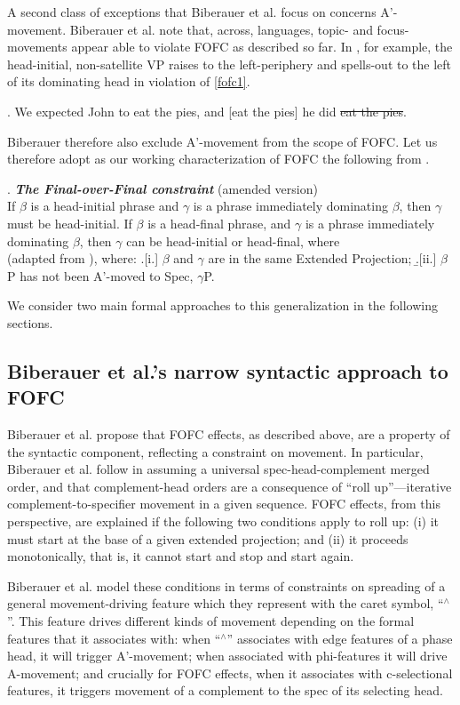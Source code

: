 \documentclass[output=paper]{langscibook}
\begin{document}
	A second class of exceptions that Biberauer et al. focus on concerns A'-movement.   Biberauer et al. note that, across, languages, topic- and focus-movements appear able to violate FOFC as described so far.  In \Next, for example, the head-initial, non-satellite VP raises to the left-periphery and spells-out to the left of its dominating head in violation of \protect\ref{fofc1}.

\ex. 	We expected John to eat the pies, and [eat the pies] he did \st{eat the pies}.\\
\citep{biberaueretal2014}
	

Biberauer therefore also exclude A'-movement from the scope of FOFC.   Let us therefore adopt as our working characterization of FOFC the following from \cite{biberaueretal2014}.

\ex. \textbf{\textit{The Final-over-Final constraint}} (amended version)\\\protect\label{fofc2}If $\beta$ is a head-initial phrase and  $\gamma$ is a phrase immediately dominating $\beta$, then $\gamma$ must be head-initial. If $\beta$ is a head-final phrase, and  $\gamma$ is a phrase immediately dominating $\beta$, then  $\gamma$ can be head-initial or head-final, where\\
(adapted from \cite{biberaueretal2014}), where: 
\a.[i.]  $\beta$ and $\gamma$ are in the same Extended Projection; 
\b.[ii.] $\beta$P has not been A'-moved to Spec, $\gamma$P.


We consider two main formal approaches to this generalization in the following sections.

\subsection{Biberauer et al.'s narrow syntactic approach to FOFC}  

Biberauer et al. propose that FOFC effects, as described above, are  a property of the syntactic component, reflecting a constraint on movement.  In particular, Biberauer et al. follow \cite{kayne1994} in assuming a universal spec-head-complement merged order, and that complement-head orders are a consequence of ``roll up''---iterative complement-to-specifier movement in a given sequence.  FOFC effects, from this perspective, are explained if the following two conditions apply to roll up: (i) it must start at the base of a given extended projection; and (ii) it proceeds monotonically, that is, it cannot start and stop and start again.

	Biberauer et al. model these conditions in terms of constraints on spreading of a general movement-driving feature which they represent with the caret symbol, ``$^\wedge$''.  This feature drives different kinds of movement depending on the formal features that it associates with:  when ``$^\wedge$'' associates with edge features of a phase head, it will trigger A'-movement; when associated with phi-features it will drive A-movement; and crucially for FOFC effects, when it associates with c-selectional features, it triggers movement of a complement to the spec of its selecting head.
\end{document}
